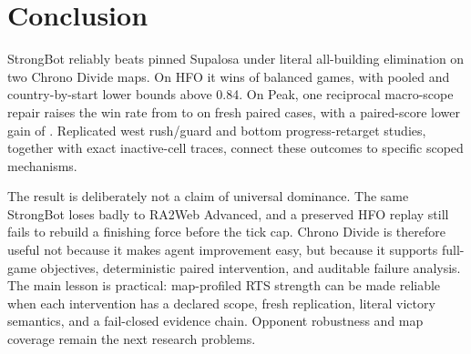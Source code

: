 \section{Conclusion}

StrongBot reliably beats pinned Supalosa under literal all-building elimination
on two Chrono Divide maps. On HFO it wins \HfoWins{} of \HfoGames{} balanced
games, with pooled and country-by-start lower bounds above 0.84. On Peak, one
reciprocal macro-scope repair raises the win rate from \PeakControlWinRate{} to
\PeakWinRate{} on fresh paired cases, with a paired-score lower gain of
\PeakPairedLower{}. Replicated west rush/guard and bottom progress-retarget
studies, together with exact inactive-cell traces, connect these outcomes to
specific scoped mechanisms.

The result is deliberately not a claim of universal dominance. The same
StrongBot loses badly to RA2Web Advanced, and a preserved HFO replay still
fails to rebuild a finishing force before the tick cap. Chrono Divide is
therefore useful not because it makes agent improvement easy, but because it
supports full-game objectives, deterministic paired intervention, and
auditable failure analysis. The main lesson is practical: map-profiled RTS
strength can be made reliable when each intervention has a declared scope,
fresh replication, literal victory semantics, and a fail-closed evidence chain.
Opponent robustness and map coverage remain the next research problems.
